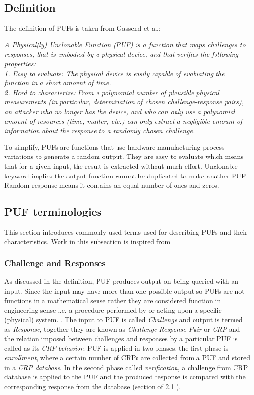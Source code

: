 \subsection{Definition}
The definition of PUFs is taken from Gassend et al.\cite{21}:

\emph{A Physical(ly) Unclonable Function (PUF) is a function that maps challenges to responses, that is embodied by a physical device, and that verifies the following properties:\\
1. Easy to evaluate: The physical device is easily capable of evaluating the function in a short amount of time.\\
2. Hard to characterize: From a polynomial number of plausible physical measurements (in particular, determination of chosen challenge-response pairs), an attacker who no longer has the device, and who can only use a polynomial amount of resources (time, matter, etc.) can only extract a negligible amount of information about the response to a randomly chosen challenge.\\}

To simplify, PUFs are functions that use hardware manufacturing process variations to generate a random output. They are easy to evaluate which means that for a given input, the result is extracted without much effort. Unclonable keyword implies the output function cannot be duplicated to make another PUF. Random response means it contains an equal number of ones and zeros.

\subsection{PUF terminologies}
This section introduces commonly used terms used for describing PUFs and their characteristics. Work in this subsection is inspired from \cite{thbook}

\subsubsection{Challenge and Responses}
As discussed in the definition, PUF produces output on being queried with an input. Since the input may have more than one possible output so PUFs are not functions in a mathematical sense rather they are considered function in engineering sense i.e. a procedure performed by or acting upon a specific (physical) system. \cite{thbook}. The input to PUF is called \emph{Challenge} and output is termed as \emph{Response}, together they are known as \emph{Challenge-Response Pair} or \emph{CRP} and
the relation imposed between challenges and responses by a particular PUF is called as its \emph{CRP behavior}. PUF is applied in two phases, the first phase is \emph{enrollment}, where a certain number of CRPs are collected from a PUF and stored in a \emph{CRP database}. In the second phase called \emph{verification}, a challenge from CRP database is applied to the PUF and the produced response is compared with the corresponding response from the database (section of 2.1 \cite{thbook}).

